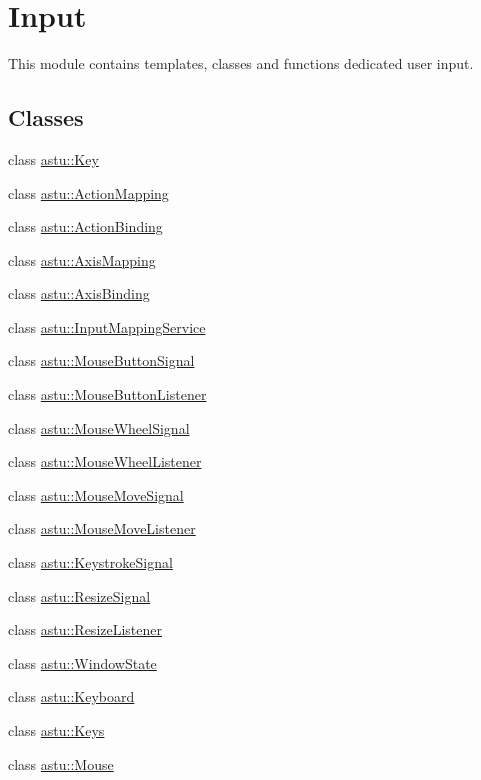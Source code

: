 \hypertarget{group__input__group}{}\section{Input}
\label{group__input__group}


This module contains templates, classes and functions dedicated user input.  


\subsection*{Classes}
\begin{DoxyCompactItemize}
\item 
class \hyperlink{classastu_1_1Key}{astu\+::\+Key}
\item 
class \hyperlink{classastu_1_1ActionMapping}{astu\+::\+Action\+Mapping}
\item 
class \hyperlink{classastu_1_1ActionBinding}{astu\+::\+Action\+Binding}
\item 
class \hyperlink{classastu_1_1AxisMapping}{astu\+::\+Axis\+Mapping}
\item 
class \hyperlink{classastu_1_1AxisBinding}{astu\+::\+Axis\+Binding}
\item 
class \hyperlink{classastu_1_1InputMappingService}{astu\+::\+Input\+Mapping\+Service}
\item 
class \hyperlink{classastu_1_1MouseButtonSignal}{astu\+::\+Mouse\+Button\+Signal}
\item 
class \hyperlink{classastu_1_1MouseButtonListener}{astu\+::\+Mouse\+Button\+Listener}
\item 
class \hyperlink{classastu_1_1MouseWheelSignal}{astu\+::\+Mouse\+Wheel\+Signal}
\item 
class \hyperlink{classastu_1_1MouseWheelListener}{astu\+::\+Mouse\+Wheel\+Listener}
\item 
class \hyperlink{classastu_1_1MouseMoveSignal}{astu\+::\+Mouse\+Move\+Signal}
\item 
class \hyperlink{classastu_1_1MouseMoveListener}{astu\+::\+Mouse\+Move\+Listener}
\item 
class \hyperlink{classastu_1_1KeystrokeSignal}{astu\+::\+Keystroke\+Signal}
\item 
class \hyperlink{classastu_1_1ResizeSignal}{astu\+::\+Resize\+Signal}
\item 
class \hyperlink{classastu_1_1ResizeListener}{astu\+::\+Resize\+Listener}
\item 
class \hyperlink{classastu_1_1WindowState}{astu\+::\+Window\+State}
\item 
class \hyperlink{classastu_1_1Keyboard}{astu\+::\+Keyboard}
\item 
class \hyperlink{classastu_1_1Keys}{astu\+::\+Keys}
\item 
class \hyperlink{classastu_1_1Mouse}{astu\+::\+Mouse}
\end{DoxyCompactItemize}
